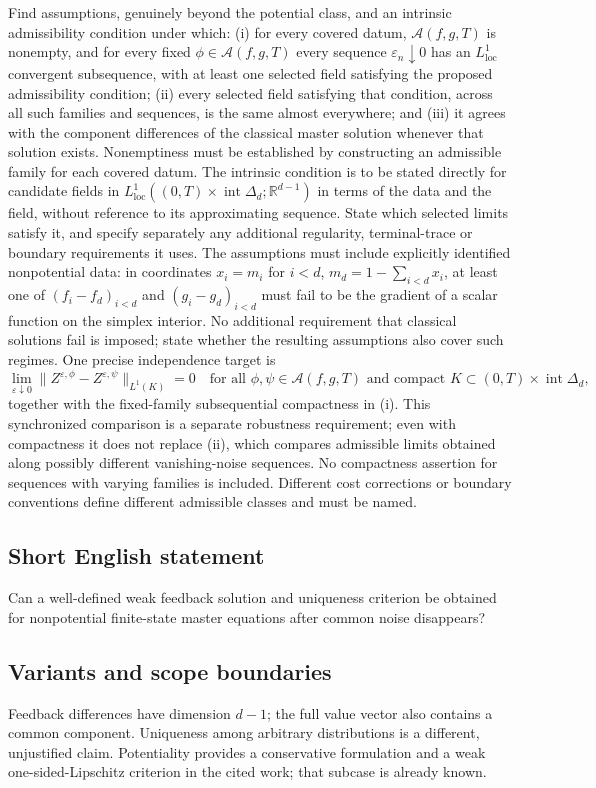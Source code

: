 \documentclass[11pt,a4paper]{article}
\begin{document}
Find assumptions, genuinely beyond the potential class, and an intrinsic admissibility condition under which: (i) for every covered datum, $\mathcal A(f,g,T)$ is nonempty, and for every fixed $\phi\in\mathcal A(f,g,T)$ every sequence $\varepsilon_n\downarrow0$ has an $L^1_{\mathrm{loc}}$ convergent subsequence, with at least one selected field satisfying the proposed admissibility condition; (ii) every selected field satisfying that condition, across all such families and sequences, is the same almost everywhere; and (iii) it agrees with the component differences of the classical master solution whenever that solution exists. Nonemptiness must be established by constructing an admissible family for each covered datum. The intrinsic condition is to be stated directly for candidate fields in $L^1_{\mathrm{loc}}((0,T)\times\operatorname{int}\Delta_d;\mathbb R^{d-1})$ in terms of the data and the field, without reference to its approximating sequence. State which selected limits satisfy it, and specify separately any additional regularity, terminal-trace or boundary requirements it uses. The assumptions must include explicitly identified nonpotential data: in coordinates $x_i=m_i$ for $i<d$, $m_d=1-\sum_{i<d}x_i$, at least one of $(f_i-f_d)_{i<d}$ and $(g_i-g_d)_{i<d}$ must fail to be the gradient of a scalar function on the simplex interior. No additional requirement that classical solutions fail is imposed; state whether the resulting assumptions also cover such regimes. One precise independence target is
\[
 \lim_{\varepsilon\downarrow0}
 \|Z^{\varepsilon,\phi}-Z^{\varepsilon,\psi}\|_{L^1(K)}=0
 \quad\text{for all }\phi,\psi\in\mathcal A(f,g,T)
 \text{ and compact }K\subset(0,T)\times\operatorname{int}\Delta_d,
\]
together with the fixed-family subsequential compactness in (i). This synchronized comparison is a separate robustness requirement; even with compactness it does not replace (ii), which compares admissible limits obtained along possibly different vanishing-noise sequences. No compactness assertion for sequences with varying families is included. Different cost corrections or boundary conventions define different admissible classes and must be named.
\subsection*{Short English statement}
Can a well-defined weak feedback solution and uniqueness criterion be obtained for nonpotential finite-state master equations after common noise disappears?
\subsection*{Variants and scope boundaries}
Feedback differences have dimension $d-1$; the full value vector also contains a common component. Uniqueness among arbitrary distributions is a different, unjustified claim. Potentiality provides a conservative formulation and a weak one-sided-Lipschitz criterion in the cited work; that subcase is already known.
\end{document}
